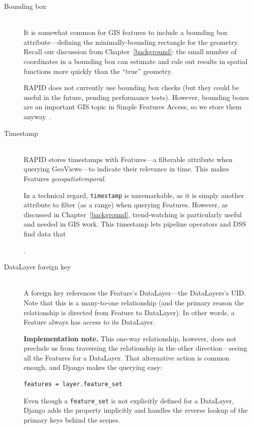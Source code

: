 \begin{description}
\item[Bounding box] \hfill \\
  It is somewhat common for GIS features to include a bounding box attribute---defining the minimally-bounding rectangle for the geometry. Recall our discussion from Chapter~\ref{background}: the small number of coordinates in a bounding box can estimate and rule out results in spatial functions more quickly than the ``true'' geometry.

  RAPID does not currently use bounding box checks (but they could be useful in the future, pending performance tests). However, bounding boxes are an important GIS topic in Simple Features Access, so we store them anyway~\cite{SFA}.
  
\item[Timestamp] \hfill \\
RAPID stores timestamps with Features---a filterable attribute when querying GeoViews---to indicate their relevance in time. This makes Features \textit{geospatiotemporal}.

In a technical regard, \texttt{timestamp} is unremarkable, as it is simply another attribute to filter (as a range) when querying Features. However, as discussed in Chapter~\ref{background}, trend-watching is particularly useful and needed in GIS work. This timestamp lets pipeline operators and DSS find data that .
  
\item[DataLayer foreign key] \hfill \\
A foreign key references the Feature's DataLayer---the DataLayers's UID. Note that this is a many-to-one relationship (and the primary reason the relationship is directed from Feature to DataLayer). In other words, a Feature always has access to its DataLayer.

\textbf{Implementation note.} This one-way relationship, however, does not preclude us from traversing the relationship in the other direction---seeing all the Features for a DataLayer. That alternative action is common enough, and Django makes the querying easy: 

\begin{Verbatim}[samepage=true,baselinestretch=1,xleftmargin=12mm]
features = layer.feature_set
\end{Verbatim}

Even though a \texttt{feature\_set} is not explicitly defined for a DataLayer, Django adds the property implicitly and handles the reverse lookup of the primary keys behind the scenes.

\end{description}

